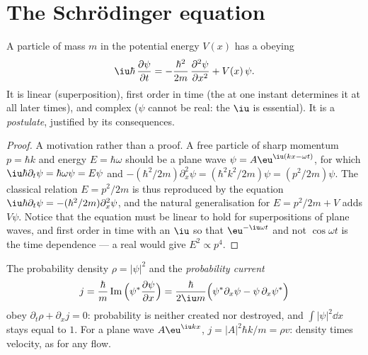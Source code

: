 \section{The Schrödinger equation}

\begin{theorem}\label{thm:b2:schrodinger-wave-functions:equation}
A particle of mass $m$ in the potential energy $V(x)$ has a  obeying
\[
\iu\hbar\,\frac{\partial\psi}{\partial t} = -\frac{\hbar^2}{2m}\,\frac{\partial^2\psi}{\partial x^2} + V(x)\,\psi .
\]
It is linear (superposition), first order in time (the 
at one instant determines it at all later times), and complex ($\psi$
cannot be real: the $\iu$ is essential). It is a \emph{postulate},
justified by its consequences.
\end{theorem}

\begin{proof}
A motivation rather than a proof. A free particle of sharp momentum
$p = \hbar k$ and energy $E = \hbar\omega$ should be a plane wave $\psi =
A\eu^{\iu(kx - \omega t)}$, for which $\iu\hbar\partial_t\psi = \hbar\omega\psi =
E\psi$ and $-(\hbar^2/2m)\partial_x^2\psi = (\hbar^2k^2/2m)\psi = (p^2/2m)\psi$.
The classical relation $E = p^2/2m$ is thus reproduced by the equation
$\iu\hbar\partial_t\psi = -(\hbar^2/2m)\partial_x^2\psi$, and the natural
generalisation for $E = p^2/2m + V$ adds $V\psi$. Notice that the
equation must be linear to hold for superpositions of plane waves, and
first order in time with an $\iu$ so that $\eu^{-\iu\omega t}$ and not
$\cos\omega t$ is the time dependence --- a real  would
give $E^2 \propto p^4$.
\end{proof}

\begin{proposition}\label{prop:b2:schrodinger-wave-functions:current}
The probability density $\rho = |\psi|^2$ and the \emph{probability
current}
\[
j = \frac{\hbar}{m}\operatorname{Im}\Big(\psi^*\frac{\partial\psi}{\partial x}\Big)
= \frac{\hbar}{2\iu m}\Big(\psi^*\partial_x\psi - \psi\,\partial_x\psi^*\Big)
\]
obey $\partial_t\rho + \partial_xj = 0$: probability is neither created nor
destroyed, and $\int|\psi|^2\dd x$ stays equal to $1$. For a plane wave
$A\eu^{\iu kx}$, $j = |A|^2\hbar k/m = \rho v$: density times velocity, as for
any flow.
\end{proposition}


